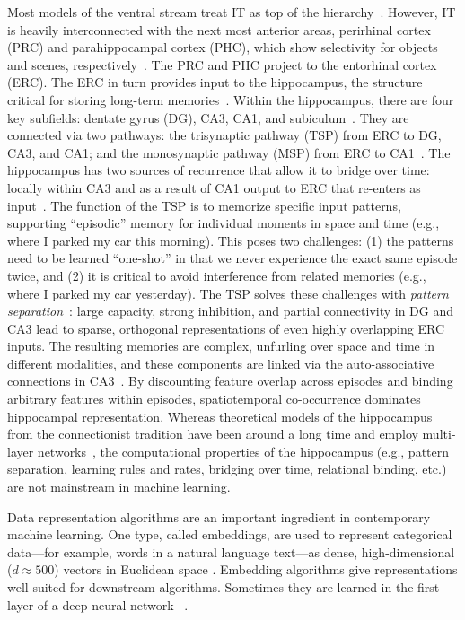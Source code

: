 Most models of the ventral stream treat IT as top of
the hierarchy~\citep[cf.][]{Saksida:2010}. However, IT is heavily interconnected with
the next most anterior areas, perirhinal cortex (PRC) and
parahippocampal cortex (PHC), which show selectivity for
objects and scenes,
respectively~\citep{Barense:2010,Davachi:2006,Ranganath:2012}. The PRC
and PHC project to the entorhinal cortex (ERC). The ERC in turn
provides input to the hippocampus, the structure critical for storing
long-term memories~\citep{Squire:1992}. Within the hippocampus, there
are four key subfields: dentate gyrus (DG), CA3, CA1, and
subiculum~\citep{Deng:2010,Shohamy:2013}. They are
connected via two pathways: the trisynaptic pathway (TSP) from ERC
to DG, CA3, and CA1; and the monosynaptic pathway (MSP) from ERC to
CA1~\citep{Schapiro:2017}. The hippocampus has two sources of
recurrence that allow it to bridge over time: locally within CA3 and
as a result of CA1 output to ERC that re-enters as
input~\citep{Kumaran:2016}. The function of the TSP is to
memorize specific input patterns, supporting ``episodic''
memory for individual moments in space and time (e.g., where I parked
my car this morning). This poses two challenges: (1) the
patterns need to be learned ``one-shot'' in that we never experience
the exact same episode twice, and (2) it is critical to avoid interference
from related memories (e.g., where I parked my car yesterday). The TSP
solves these challenges with \textit{pattern
separation}~\citep{Leutgeb:2007,Yassa:2011,Rolls:2016}: large capacity,
strong inhibition, and partial connectivity in DG and CA3 lead to
sparse, orthogonal representations of even highly overlapping ERC
inputs. The resulting memories are complex, unfurling over space and
time in different modalities, and these
components are linked via the auto-associative connections in
CA3~\citep{Wallenstein:1998}. By discounting feature overlap across
episodes and binding arbitrary features within episodes,
spatiotemporal co-occurrence dominates hippocampal representation.
Whereas theoretical models of the hippocampus from the connectionist
tradition have been around a long time and employ multi-layer
networks~\citep{McClelland:1995,Norman:2003}, the computational
properties of the hippocampus (e.g., pattern separation, learning rules and rates, 
bridging over time, relational binding, etc.) are not mainstream in machine learning.

\statbackground{}
Data representation algorithms are an important ingredient in contemporary
machine learning. One type, called embeddings, are used to represent
categorical data---for example, words in a natural language text---as
dense, high-dimensional ($d\approx 500$) vectors in Euclidean space \citep{Mikolov:2013}.
Embedding algorithms give representations well suited for downstream
algorithms. Sometimes they are learned in the first layer of
a deep neural network ~\citep{Bengio:2003}.  

